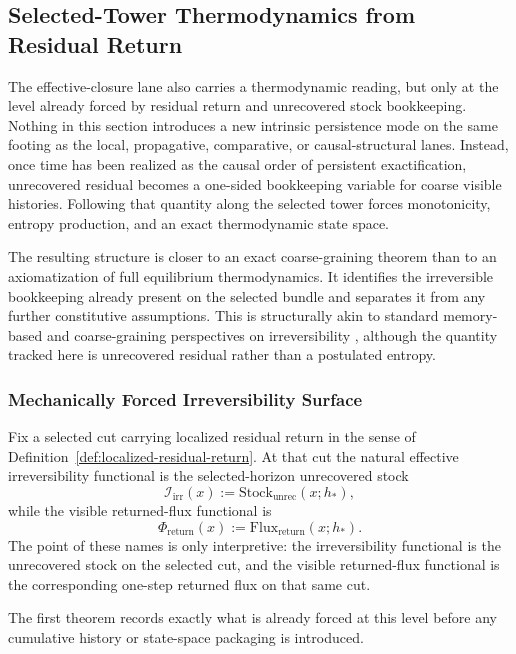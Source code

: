 \subsection{Selected-Tower Thermodynamics from Residual Return}
\label{sec:flagship-thermodynamics}

The effective-closure lane also carries a thermodynamic reading, but only at
the level already forced by residual return and unrecovered stock bookkeeping.
Nothing in this section introduces a new intrinsic persistence mode on the
same footing as the local, propagative, comparative, or causal-structural
lanes. Instead, once time has been realized as the causal order of persistent
exactification, unrecovered residual becomes a one-sided bookkeeping variable
for coarse visible histories. Following that quantity along the selected tower
forces monotonicity, entropy production, and an exact thermodynamic state
space.

The resulting structure is closer to an exact coarse-graining theorem than to
an axiomatization of full equilibrium thermodynamics. It identifies the
irreversible bookkeeping already present on the selected bundle and separates
it from any further constitutive assumptions. This is structurally akin to
standard memory-based and coarse-graining perspectives on irreversibility
\cite{Zwanzig1961,ChorinHaldKupferman2000}, although the quantity tracked here
is unrecovered residual rather than a postulated entropy.

\subsubsection{Mechanically Forced Irreversibility Surface}

Fix a selected cut carrying localized residual return in the sense of
Definition~\ref{def:localized-residual-return}. At that cut the natural
effective irreversibility functional is the selected-horizon unrecovered stock
\[
\mathcal I_{\mathrm{irr}}(x)
:=
\mathrm{Stock}_{\mathrm{unrec}}(x;h_\ast),
\]
while the visible returned-flux functional is
\[
\Phi_{\mathrm{return}}(x)
:=
\mathrm{Flux}_{\mathrm{return}}(x;h_\ast).
\]
The point of these names is only interpretive: the irreversibility functional
is the unrecovered stock on the selected cut, and the visible returned-flux
functional is the corresponding one-step returned flux on that same cut.

The first theorem records exactly what is already forced at this level before
any cumulative history or state-space packaging is introduced.

